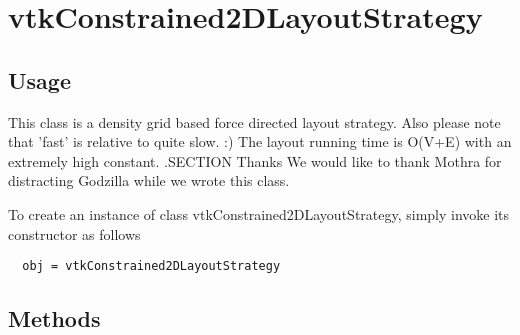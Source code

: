 \section{vtkConstrained2DLayoutStrategy}

\subsection{Usage}

 This class is a density grid based force directed layout strategy.
 Also please note that 'fast' is relative to quite slow. :)
 The layout running time is O(V+E) with an extremely high constant.
 .SECTION Thanks
 We would like to thank Mothra for distracting Godzilla while we
 wrote this class. 

To create an instance of class vtkConstrained2DLayoutStrategy, simply
invoke its constructor as follows
\begin{verbatim}
  obj = vtkConstrained2DLayoutStrategy
\end{verbatim}
\subsection{Methods}

